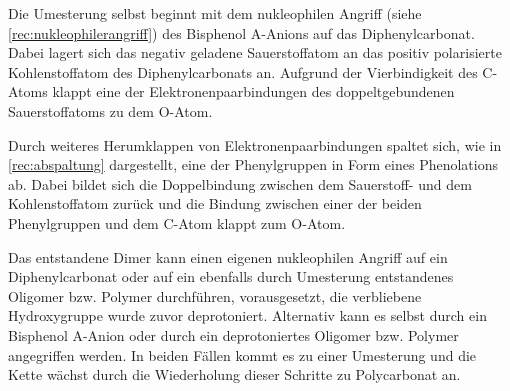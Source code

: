 Die Umesterung selbst beginnt mit dem nukleophilen Angriff (siehe
\autoref{rec:nukleophilerangriff}) des Bisphenol A-Anions auf das
Diphenylcarbonat. Dabei lagert sich das negativ geladene Sauerstoffatom an das
positiv polarisierte Kohlenstoffatom des Diphenylcarbonats an. Aufgrund der
Vierbindigkeit des C-Atoms \glqq klappt\grqq{} eine der Elektronenpaarbindungen
des doppeltgebundenen Sauerstoffatoms zu dem O-Atom.

Durch weiteres \glqq Herumklappen\grqq{} von Elektronenpaarbindungen spaltet
sich, wie in \autoref{rec:abspaltung} dargestellt, eine der Phenylgruppen in
Form eines Phenolations ab. Dabei bildet sich die Doppelbindung zwischen dem
Sauerstoff- und dem Kohlenstoffatom zurück und die Bindung zwischen einer der
beiden Phenylgruppen und dem C-Atom \glqq klappt\grqq{} zum O-Atom.

Das entstandene Dimer kann einen eigenen nukleophilen Angriff auf ein
Diphenylcarbonat oder auf ein ebenfalls durch Umesterung entstandenes Oligomer
bzw. Polymer durchführen, vorausgesetzt, die verbliebene Hydroxygruppe wurde
zuvor deprotoniert. Alternativ kann es selbst durch ein Bisphenol A-Anion oder
durch ein deprotoniertes Oligomer bzw. Polymer angegriffen werden. In beiden
Fällen kommt es zu einer Umesterung und die Kette wächst durch die Wiederholung
dieser Schritte zu Polycarbonat an.

